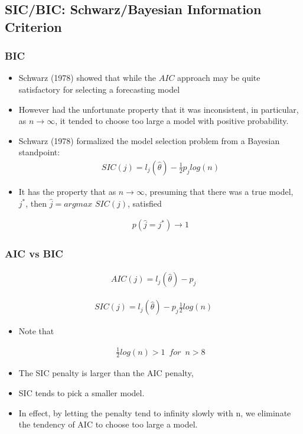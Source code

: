 \documentclass[
  shownotes,
  xcolor={svgnames},
  hyperref={colorlinks,citecolor=DarkBlue,linkcolor=DarkRed,urlcolor=DarkBlue}
  , aspectratio=169]{beamer}
\begin{document}
\subsection{SIC/BIC: Schwarz/Bayesian Information Criterion}
\begin{frame}[fragile]
\frametitle{BIC}
\begin{itemize}
\item Schwarz (1978) showed that while the $AIC$ approach may be quite satisfactory for selecting a forecasting model 
\item However had the unfortunate property that it was inconsistent, in particular, as $n \rightarrow \infty$, it tended to choose too large a model with positive probability. 

\item Schwarz (1978) formalized the model selection problem from a Bayesian standpoint: 
\begin{align}
SIC(j) = l_j(\hat \theta) -\frac{1}{2} p_j log(n)
\end{align}

\item It has the property that as $n\rightarrow \infty$, presuming that there was a true model, $j^*$, then $\hat j =argmax\,\, SIC(j)$, satisfied

\begin{align}
p(\hat j = j^*) \rightarrow 1
\end{align}
\end{itemize}
\end{frame}
\begin{frame}[fragile]
\frametitle{AIC vs BIC}

\begin{align}
AIC(j) = l_j(\hat \theta) - p_j
\end{align}


\begin{align}
SIC(j) = l_j(\hat \theta) -  p_j \frac{1}{2} log(n)
\end{align}

\begin{itemize}
\item Note that  

\begin{align}
\frac{1}{2} log(n) > 1 \,\,\, for \,\,\, n > 8
\end{align}

 \item The SIC penalty is larger than the AIC penalty, 
 \item SIC tends to pick a smaller model. 
 \item In effect, by letting the penalty tend to infinity slowly with n, we eliminate the tendency of AIC to choose too large a model.

\end{itemize}
\end{frame}
\end{document}
